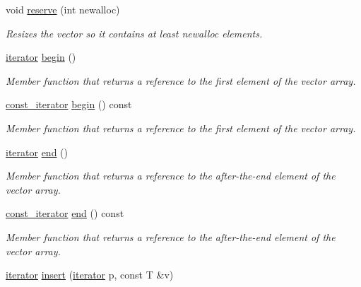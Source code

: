 \begin{DoxyCompactItemize}
void \mbox{\hyperlink{classproject_1_1vector_ab1cd63b3d7cd670c1b5c001513772d27}{reserve}} (int newalloc)
\begin{DoxyCompactList}\small\item\em Resizes the vector so it contains at least newalloc elements. \end{DoxyCompactList}\item 
\mbox{\hyperlink{classproject_1_1vector_a429c6a5f47b0de55ac858b3be5aeda8b}{iterator}} \mbox{\hyperlink{classproject_1_1vector_a324695bbd462ffcced50b8f3ac75ca68}{begin}} ()
\begin{DoxyCompactList}\small\item\em Member function that returns a reference to the first element of the vector array. \end{DoxyCompactList}\item 
\mbox{\hyperlink{classproject_1_1vector_ab242a1c8c7abec9b305e502ff7cd0fb2}{const\+\_\+iterator}} \mbox{\hyperlink{classproject_1_1vector_ac10d2b8ac2cee034dddadc2b7f06b9de}{begin}} () const
\begin{DoxyCompactList}\small\item\em Member function that returns a reference to the first element of the vector array. \end{DoxyCompactList}\item 
\mbox{\hyperlink{classproject_1_1vector_a429c6a5f47b0de55ac858b3be5aeda8b}{iterator}} \mbox{\hyperlink{classproject_1_1vector_a3b63135e2ef4bca97d475d743c86f50a}{end}} ()
\begin{DoxyCompactList}\small\item\em Member function that returns a reference to the after-\/the-\/end element of the vector array. \end{DoxyCompactList}\item 
\mbox{\hyperlink{classproject_1_1vector_ab242a1c8c7abec9b305e502ff7cd0fb2}{const\+\_\+iterator}} \mbox{\hyperlink{classproject_1_1vector_acbbe95f585298ffc4061563b6ce4fe98}{end}} () const
\begin{DoxyCompactList}\small\item\em Member function that returns a reference to the after-\/the-\/end element of the vector array. \end{DoxyCompactList}\item 
\mbox{\hyperlink{classproject_1_1vector_a429c6a5f47b0de55ac858b3be5aeda8b}{iterator}} \mbox{\hyperlink{classproject_1_1vector_a679394aec4be2d7ceea3261e47302545}{insert}} (\mbox{\hyperlink{classproject_1_1vector_a429c6a5f47b0de55ac858b3be5aeda8b}{iterator}} p, const T \&v)

\end{DoxyCompactItemize}
